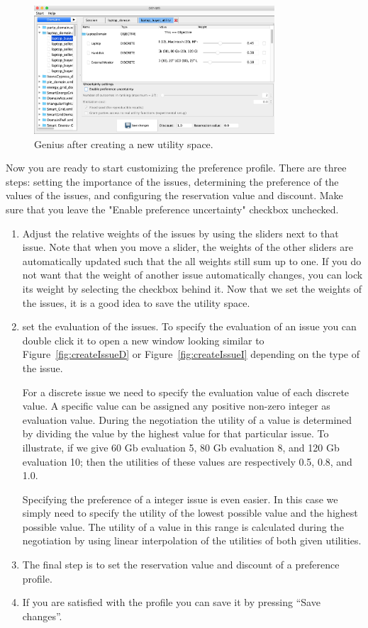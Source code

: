 \documentclass[]{article}
\newcommand\Genius{{\sc Genius}}
\begin{document}
\begin{figure}[htb]
	\centering
	\includegraphics[width=0.8\textwidth]{media/laptop.png}
\caption{{\Genius} after creating a new utility space.}\label{fig:utilcreated}
\end{figure}

Now you are ready to start customizing the preference profile. There are three steps: setting the importance of the issues, determining the preference of the values of the issues, and configuring the reservation value and discount. Make sure that you leave the "Enable preference uncertainty" checkbox unchecked.

\begin{enumerate}
\item Adjust the relative weights of the issues by using the sliders next to that issue. Note that when you move a slider, the weights of the other sliders are automatically updated such that the all weights still sum up to one. If you do not want that the weight of another issue automatically changes, you can lock its weight by selecting the checkbox behind it. Now that we set the weights of the issues, it is a good idea to save the utility space.
\item set the evaluation of the issues. To specify the evaluation of an issue you can double click it to open a new window looking similar to Figure~\ref{fig:createIssueD} or Figure~\ref{fig:createIssueI} depending on the type of the issue.

For a discrete issue we need to specify the evaluation value of each discrete value. A specific value can be assigned any positive non-zero integer as evaluation value. During the negotiation the utility of a value is determined by dividing the value by the highest value for that particular issue. To illustrate, if we give 60 Gb evaluation 5, 80 Gb evaluation 8, and 120 Gb evaluation 10; then the utilities of these values are respectively 0.5, 0.8, and 1.0.

Specifying the preference of a integer issue is even easier. In this case we simply need to specify the utility of the lowest possible value and the highest possible value. The utility of a value in this range is calculated during the negotiation by using linear interpolation of the utilities of both given utilities.

\item The final step is to set the reservation value and discount of a preference profile. 

\item If you are satisfied with the profile you can save it by pressing ``Save changes''. 
\end{enumerate}
\end{document}
